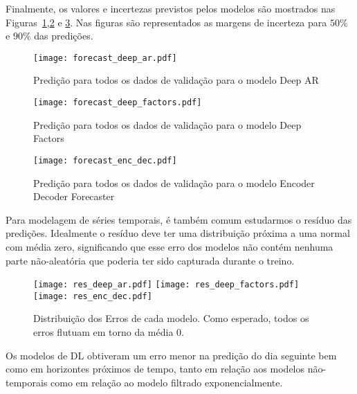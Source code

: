 Finalmente, os valores e incertezas previstos pelos modelos são mostrados nas
Figuras~\ref{fig:fordeepar},\ref{fig:fordeepfactors} e \ref{fig:forencdec}. Nas
figuras são representados as margens de incerteza para $50\%$ e $90\%$ das predições.

\begin{figure}[H]
  \centering
\texttt{[image: forecast\_deep\_ar.pdf]} 
\caption{Predição para todos os dados de validação para o modelo Deep AR}
\label{fig:fordeepar}
\end{figure}

\begin{figure}[H]
  \centering
\texttt{[image: forecast\_deep\_factors.pdf]} 
\caption{Predição para todos os dados de validação para o modelo Deep Factors}
\label{fig:fordeepfactors}
\end{figure}

\begin{figure}[H]
  \centering
\texttt{[image: forecast\_enc\_dec.pdf]} 
\caption{Predição para todos os dados de validação para o modelo Encoder Decoder Forecaster} 
\label{fig:forencdec}
\end{figure}


Para modelagem de séries temporais, é também comum estudarmos o resíduo das
predições. Idealmente o resíduo deve ter uma distribuição próxima a uma normal
com média zero, significando que esse erro dos modelos não contém nenhuma parte
não-aleatória que poderia ter sido capturada durante o treino. 

\begin{figure}[H]
\label{fig:res}
\centering
\texttt{[image: res\_deep\_ar.pdf]} \hfill
\texttt{[image: res\_deep\_factors.pdf]} \hfill
\texttt{[image: res\_enc\_dec.pdf]} 
\caption{Distribuição dos Erros de cada modelo. Como esperado, todos os erros flutuam em torno da média 0. } 
\end{figure}


Os modelos de DL obtiveram um erro menor na predição do dia seguinte bem como em
horizontes próximos de tempo, tanto em relação aos modelos não-temporais como em
relação ao modelo filtrado exponencialmente.

